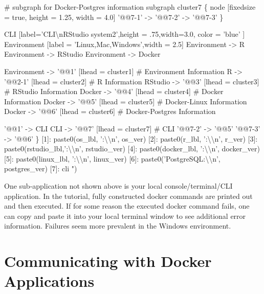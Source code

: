 \documentclass[]{book}
\newenvironment{Shaded}{\begin{snugshade}}{\end{snugshade}}
\newcommand{\CharTok}[1]{\textcolor[rgb]{0.31,0.60,0.02}{#1}}
\newcommand{\NormalTok}[1]{#1}
\newcommand{\StringTok}[1]{\textcolor[rgb]{0.31,0.60,0.02}{#1}}
\theoremstyle{definition}
\theoremstyle{definition}
\theoremstyle{definition}
\theoremstyle{remark}
\begin{document}
\begin{Shaded}
\begin{Highlighting}[]
\StringTok{  # subgraph for Docker-Postgres information}
\StringTok{  subgraph cluster7 \{}
\StringTok{    node [fixedsize = true, height = 1.25, width = 4.0]}
\StringTok{    '@@7-1' -> '@@7-2' -> '@@7-3'}
\StringTok{  \}}

\StringTok{  CLI [label='CLI}\CharTok{\textbackslash{}n}\StringTok{RStudio system2',height = .75,width=3.0, color = 'blue' ]}
\StringTok{  Environment             [label = 'Linux,Mac,Windows',width = 2.5]}
\StringTok{  Environment -> R}
\StringTok{  Environment -> RStudio}
\StringTok{  Environment -> Docker}

\StringTok{  Environment -> '@@1'    [lhead = cluster1] # Environment Information}
\StringTok{  R           -> '@@2-1'  [lhead = cluster2] # R Information}
\StringTok{  RStudio     -> '@@3'    [lhead = cluster3] # RStudio Information}
\StringTok{  Docker      -> '@@4'    [lhead = cluster4] # Docker Information}
\StringTok{  Docker      -> '@@5'    [lhead = cluster5] # Docker-Linux Information}
\StringTok{  Docker      -> '@@6'    [lhead = cluster6] # Docker-Postgres Information}

\StringTok{  '@@1' -> CLI}
\StringTok{  CLI         -> '@@7'    [lhead = cluster7] # CLI }
\StringTok{  '@@7-2'     -> '@@5'}
\StringTok{  '@@7-3'     -> '@@6'}
\StringTok{\}}
\StringTok{[1]: paste0(os_lbl,     ':}\CharTok{\textbackslash{}\textbackslash{}}\StringTok{n', os_ver)}
\StringTok{[2]: paste0(r_lbl,      ':}\CharTok{\textbackslash{}\textbackslash{}}\StringTok{n', r_ver)}
\StringTok{[3]: paste0(rstudio_lbl,':}\CharTok{\textbackslash{}\textbackslash{}}\StringTok{n', rstudio_ver)}
\StringTok{[4]: paste0(docker_lbl, ':}\CharTok{\textbackslash{}\textbackslash{}}\StringTok{n', docker_ver)}
\StringTok{[5]: paste0(linux_lbl,  ':}\CharTok{\textbackslash{}\textbackslash{}}\StringTok{n', linux_ver)}
\StringTok{[6]: paste0('PostgreSQL:}\CharTok{\textbackslash{}\textbackslash{}}\StringTok{n', postgres_ver)}
\StringTok{[7]: cli}
\StringTok{"}\NormalTok{)}
\end{Highlighting}
\end{Shaded}

One sub-application not shown above is your local console/terminal/CLI
application. In the tutorial, fully constructed docker commands are
printed out and then executed. If for some reason the executed docker
command fails, one can copy and paste it into your local terminal window
to see additional error information. Failures seem more prevalent in the
Windows environment.

\hypertarget{communicating-with-docker-applications-1}{%
\section{Communicating with Docker
Applications}\label{communicating-with-docker-applications-1}}
\end{document}
